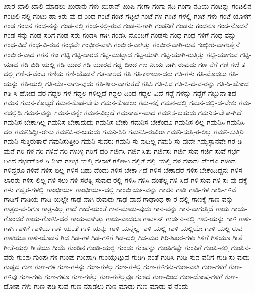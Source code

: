 {ಖಾರ
ಖಾಲಿ
ಖಾಲಿ-ಮಾಡಲು
ಖುರಾನು-ಗಳು
ಖುರಾನ್
ಖುಷಿ
ಗಂಗಾ
ಗಂಗಾ-ನದಿ
ಗಂಗಾ-ನದಿಯ
ಗಂಟನ್ನು
ಗಂಟಲಿನ
ಗಂಟಲಿ-ನಲ್ಲಿ
ಗಂಟು-ಹಾ-ಕಿರು-ವು-ದ-ರಿಂದ
ಗಂಟೆ
ಗಂಟೆ-ಗಟ್ಟಲೆ
ಗಂಟೆ-ಗಳ
ಗಂಟೆ-ಗಳಲ್ಲಿ
ಗಂಟೆ-ಗಳು
ಗಂಟೆ-ಯೊಳಗೆ
ಗಂಡ
ಗಂಡನ
ಗಂಡ-ನನ್ನು
ಗಂಡ-ನಲ್ಲಿ
ಗಂಡ-ನಲ್ಲಿ-ರುವ
ಗಂಡ-ನಿ-ಗಾಗಿ
ಗಂಡನಿಗೆ
ಗಂಡನು
ಗಂಡನೂ
ಗಂಡ-ನೊಡನೆ
ಗಂಡ-ಸನ್ನು
ಗಂಡ-ಸರಿಗೆ
ಗಂಡ-ಸರು
ಗಂಡಸಿ-ಗಾಗಿ
ಗಂಡಸಿ-ನೊಂದಿಗೆ
ಗಂಡಸು
ಗಂಧ
ಗಂಧ-ಗಳಿಗೆ
ಗಂಧ-ವನ್ನು
ಗಂಧ-ವಿದೆ
ಗಂಧ-ವಿ-ರುವ
ಗಂಧವೇ
ಗಂಭೀರ-ವಾಗಿ
ಗಂಭೀರ-ವಾಗಿತ್ತು
ಗಂಭೀರ-ವಾಗಿ-ರುವ
ಗಂಭೀರ-ವಾಗುತ್ತೇನೆ
ಗಂಭೀರ-ವಾದ
ಗಗನ
ಗಜ
ಗಟ್ಟಿ
ಗಟ್ಟಿ-ದಾರದ
ಗಟ್ಟಿ-ಮುಟ್ಟಾದ
ಗಟ್ಟಿ-ಯಾಗಿ
ಗಟ್ಟಿ-ಯಾಗಿ-ರುತ್ತಿತ್ತು
ಗಟ್ಟಿ-ಯಾಗುವ
ಗಟ್ಟಿ-ಯಾದ
ಗಡಿ-ಬಿಡಿ-ಯಲ್ಲಿ
ಗಡಿ-ಯಾರ
ಗಡಿ-ಯಾರದ
ಗಡ್ಡ-ದಿಂದ
ಗಣ-ನೀಯ-ವಾಗಿ-ರುವುದು
ಗಣ-ನೆಗೆ
ಗಣಿ
ಗಣಿ-ತ-ದಲ್ಲಿ
ಗಣಿ-ತ-ವೆಂಬ
ಗಣಿಯ
ಗಣಿ-ಯೊಡನೆ
ಗತ-ಕಾಲದ
ಗತಿ
ಗತಿ-ಕಾಣದಾ-ದರು
ಗತಿ-ಗಳು
ಗತಿ-ಮೊದಲು
ಗತಿ-ಯನ್ನು
ಗತಿ-ಯಲ್ಲಿ
ಗತಿ-ಯೇ-ನಾಗು-ವುದು
ಗತಿ-ಶೀಲ-ವಾಗುತ್ತದೆ
ಗತಿಸಿ
ಗತಿ-ಸಿದ
ಗತಿ-ಸಿ-ದ-ವ-ರನ್ನು
ಗತಿ-ಸಿ-ಹೋದ
ಗತಿ-ಸಿ-ಹೋದ-ವರ
ಗದ್ದಲ-ಗಳ
ಗದ್ದಲ-ಗಳಿಲ್ಲದೆ
ಗದ್ದಲ-ದಿಂದ
ಗದ್ದಲ-ವಿದೆ
ಗದ್ದೆ-ಗಳನ್ನು
ಗದ್ದೆಗೆ
ಗಬ್ಬುನಾ-ತದ
ಗಮನ
ಗಮನ-ಕೊಟ್ಟರೆ
ಗಮನ-ಕೊಡ-ಬೇಕು
ಗಮನ-ಕೊಡಲು
ಗಮ-ನಕ್ಕೆ
ಗಮನ-ದಲ್ಲಿ
ಗಮನ-ದಲ್ಲಿ-ಡ-ಬೇಕು
ಗಮ-ನದಲ್ಲಿಡಿ
ಗಮನ-ವನ್ನು
ಗಮನ-ವನ್ನೇ
ಗಮನ-ವಿಲ್ಲದೆ
ಗಮನಾರ್ಹ-ವಾದ
ಗಮನಿಸ-ಬಹುದು
ಗಮನಿಸ-ಬೇಕಾ-ಗಿದೆ
ಗಮನಿಸ-ಬೇಕಾಗಿಲ್ಲ
ಗಮನಿಸ-ಬೇಕಾದುದು
ಗಮನಿಸ-ಬೇಕು
ಗಮನಿಸ-ಬೇಕೆಂದೂ
ಗಮನಿಸ-ಲಿಲ್ಲ
ಗಮನಿಸಿ
ಗಮನಿಸಿ-ದರೆ
ಗಮನಿಸಿದ್ದೀ-ರೇನು
ಗಮನಿಸಿ-ರ-ಬಹುದು
ಗಮನಿ-ಸಿರಿ
ಗಮನಿಸಿ-ರುವಿರಾ
ಗಮನಿ-ಸುತ್ತಿ-ರ-ಲಿಲ್ಲ
ಗಮನಿ-ಸುತ್ತಿರಿ
ಗಮನಿ-ಸುತ್ತಿರುತ್ತಾರೆ
ಗಮನಿಸುತ್ತೀರಿ
ಗಮನಿ-ಸುವರು
ಗಮನಿ-ಸು-ವುದಿಲ್ಲ
ಗಮನಿ-ಸು-ವುದೇ
ಗಮ್ಯಸ್ಥಾನವೇ
ಗರ-ಡಿ-ಮನೆ
ಗರಿ-ಗಳ
ಗರಿ-ಗಳಿವೆ
ಗರಿ-ಗಳುಳ್ಳ
ಗರಿಗೆ-ದರಿ
ಗರ್ಜಿಸಿ
ಗರ್ಜಿ-ಸಿತು
ಗರ್ಜಿಸು
ಗರ್ಜಿ-ಸುವ
ಗರ್ಜಿ-ಸುವೆ
ಗರ್ಭ-ದಿಂದ
ಗರ್ಭದೊಳ-ಗಿ-ನಿಂದ
ಗಲಭೆ-ಯಲ್ಲಿ
ಗಲಾಟೆ
ಗಲೀಜು
ಗಲ್ಲಿಗೆ
ಗಲ್ಲಿ-ಯಲ್ಲಿ
ಗಳ
ಗಳಾದು-ವೆಂದೂ
ಗಳಿಂದ
ಗಳಿದ್ದರೂ
ಗಳಿವೆ
ಗಳಿಸ-ಬಲ್ಲ
ಗಳಿಸ-ಬಹು-ದೆಂದು
ಗಳಿಸ-ಬೇಕಾ-ಗಿದೆ
ಗಳಿಸ-ಬೇಕಾದರೆ
ಗಳಿಸ-ಬೇಕೆಂದಿದ್ದನು
ಗಳಿಸ-ಲಾರರು
ಗಳಿಸ-ಲಿಲ್ಲ
ಗಳಿ-ಸಲು
ಗಳಿ-ಸಲೆತ್ನಿ-ಸುವುದ-ರಲ್ಲಿ
ಗಳಿಸಿ
ಗಳಿಸಿ-ದಂತೆಲ್ಲ
ಗಳಿ-ಸಿದೆ
ಗಳಿ-ಸುವ
ಗಳಿ-ಸು-ವು-ದಕ್ಕೆ
ಗಳು
ಗಹ್ವರ-ಗಳಲ್ಲಿ
ಗಾಂಭೀರ್ಯ
ಗಾಂಭೀರ್ಯ-ದಲ್ಲಿ
ಗಾಂಭೀರ್ಯ-ವನ್ನು
ಗಾಜಿನ
ಗಾಡಿ
ಗಾಡಿ-ಗಳ
ಗಾಡಿ-ಗಳಿವೆ
ಗಾಡಿಗೆ
ಗಾಡಿಯ
ಗಾಡಿ-ಯಲ್ಲೇ
ಗಾಢ-ವಾಗಿ-ರುವುದು
ಗಾಢ-ವಾದ
ಗಾಢಾಂಧ-ಕಾ-ರ-ದಲ್ಲಿ
ಗಾಣಕ್ಕೆ
ಗಾಣ-ವನ್ನು
ಗಾತ್ರದ-ವ-ರಿಗೂ
ಗಾತ್ರ-ವಿಲ್ಲ
ಗಾದೆ
ಗಾದೆ-ಯಂತೆ
ಗಾನ-ಮಾಡು-ವುದು
ಗಾನ-ವನ್ನು
ಗಾನ-ವಾಗುತ್ತಿದೆ
ಗಾಯ
ಗಾಯ-ಗೊಂಡರೆ
ಗಾಯ-ಗೊಳಿಸಿ-ದರೆ
ಗಾಯ-ವಾಗಿತ್ತು
ಗಾಯ-ವಾದರೂ
ಗಾರ್ಟನ್
ಗಾರ್ಡನಿ-ನಲ್ಲಿ
ಗಾಲಿ-ಯನ್ನು
ಗಾಳಿ
ಗಾಳಿ-ಗಾಗಿ
ಗಾಳಿಗೆ
ಗಾಳಿಯ
ಗಾಳಿ-ಯಂತೆ
ಗಾಳಿ-ಯನ್ನು
ಗಾಳಿ-ಯನ್ನೆಲ್ಲ
ಗಾಳಿ-ಯಲ್ಲಿ
ಗಾಳಿ-ಯಲ್ಲಿಯೇ
ಗಾಳಿ-ಯಲ್ಲಿ-ರುವ
ಗಾಳಿಯೂ
ಗಾಳಿ-ಯೊಡನೆ
ಗಿಡ
ಗಿಡ-ಗಳ
ಗಿಡ-ಗಳಿಗೆ
ಗಿಡ-ದಲ್ಲಿ
ಗಿಡ-ಮರ
ಗಿರಿ-ಶಿಖರ-ಗಳು
ಗಿಳಿಗೆ
ಗಿಳಿಯೂ
ಗೀತೆ
ಗೀತೆ-ಯಲ್ಲಿ
ಗೀತೆಯು
ಗೀಯೆ
ಗುಂಡಿನ
ಗುಂಡಿ-ಯಲ್ಲಿ
ಗುಂಡು
ಗುಂಪನ್ನು
ಗುಂಪಿಗಷ್ಟೇ
ಗುಂಪಿಗೆ
ಗುಂಪಿ-ನಲ್ಲಿ
ಗುಂಪಿನ-ವರು
ಗುಂಪು
ಗುಂಪು-ಗಳ
ಗುಂಪು-ಗುಂಪಾಗಿ
ಗುಂಯ್ಗುಟ್ಟುವ
ಗುಡಿಗಿ-ನಂತೆ
ಗುಡಿಸಿ
ಗುಡಿ-ಸುವ-ವನಿಗೆ
ಗುಡಿ-ಸು-ವುದು
ಗುಡ್ಡದ
ಗುಣ
ಗುಣ-ಗಳ
ಗುಣ-ಗಳನ್ನು
ಗುಣ-ಗಳಲ್ಲ
ಗುಣ-ಗಳಲ್ಲಿ
ಗುಣ-ಗಳಿಗನು-ಗುಣ-ವಾಗಿ
ಗುಣ-ಗಳಿಗೆ
ಗುಣ-ಗಳಿವು
ಗುಣ-ಗಳು
ಗುಣ-ಗಳೂ
ಗುಣ-ಗಳೆಲ್ಲ
ಗುಣ-ಗಳೆಲ್ಲವೂ
ಗುಣದ
ಗುಣ-ದಿಂದ
ಗುಣ-ದೋಷ-ಗಳಿಗೆ
ಗುಣ-ದೋಷ-ಗಳು
ಗುಣ-ಪಡಿ-ಸುವ
ಗುಣ-ಮಾಡಲು
ಗುಣ-ಮಾಡು
ಗುಣ-ಮಾಡು-ವ-ನೆಂದು
}
